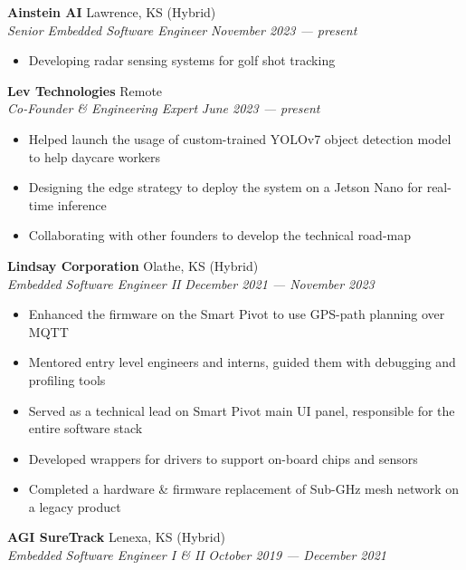 \documentclass[a4paper]{article}
\begin{document}
\textbf{Ainstein AI} \hfill Lawrence, KS (Hybrid)\\
\textit{Senior Embedded Software Engineer} \hfill \textit{November 2023 --- present}\\
\vspace{-1mm}
\begin{itemize}
    \item Developing radar sensing systems for golf shot tracking
\end{itemize}
\textbf{Lev Technologies} \hfill Remote\\
\textit{Co-Founder \& Engineering Expert} \hfill \textit{June 2023 --- present}\\
\vspace{-1mm}
\begin{itemize} \itemsep 1pt
    \item Helped launch the usage of custom-trained YOLOv7 object detection model to help daycare workers
    \item Designing the edge strategy to deploy the system on a Jetson Nano for real-time inference
    \item Collaborating with other founders to develop the technical road-map
\end{itemize}
\textbf{Lindsay Corporation} \hfill Olathe, KS (Hybrid)\\
\textit{Embedded Software Engineer II} \hfill \textit{December 2021 --- November 2023}\\
\vspace{-1mm}
\begin{itemize} \itemsep 1pt
    \item Enhanced the firmware on the Smart Pivot to use GPS-path planning over MQTT
    \item Mentored entry level engineers and interns, guided them with debugging and profiling tools
    \item Served as a technical lead on Smart Pivot main UI panel, responsible for the entire software stack
    \item Developed wrappers for drivers to support on-board chips and sensors
    \item Completed a hardware \& firmware replacement of Sub-GHz mesh network on a legacy product
\end{itemize}
\textbf{AGI SureTrack} \hfill Lenexa, KS (Hybrid)\\
\textit{Embedded Software Engineer I \& II} \hfill \textit{October 2019 --- December 2021}\\
\vspace{-1mm}
\end{document}
